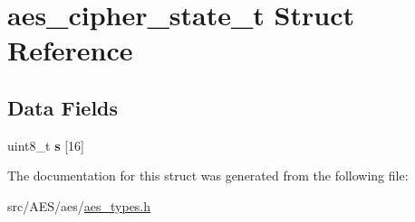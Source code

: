 \hypertarget{structaes__cipher__state__t}{\section{aes\+\_\+cipher\+\_\+state\+\_\+t Struct Reference}
\label{structaes__cipher__state__t}
}
\subsection*{Data Fields}
\begin{DoxyCompactItemize}
\item 
\hypertarget{structaes__cipher__state__t_ae9267f97d76009b78c1502fc433d0f97}{uint8\+\_\+t {\bfseries s} \mbox{[}16\mbox{]}}\label{structaes__cipher__state__t_ae9267f97d76009b78c1502fc433d0f97}

\end{DoxyCompactItemize}


The documentation for this struct was generated from the following file\+:\begin{DoxyCompactItemize}
\item 
src/\+A\+E\+S/aes/\hyperlink{aes__types_8h}{aes\+\_\+types.\+h}\end{DoxyCompactItemize}
